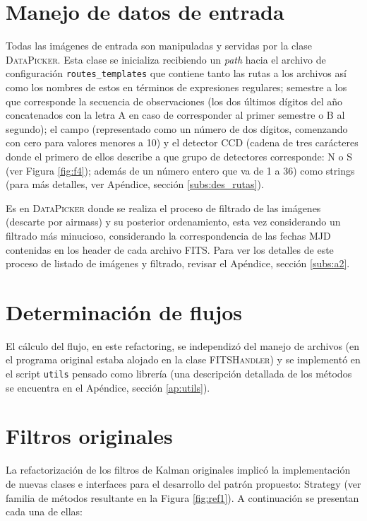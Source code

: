 \section{Manejo de datos de entrada}
Todas las im\'agenes de entrada son manipuladas y servidas por la clase \textsc{DataPicker}. Esta clase se inicializa recibiendo un \textit{path} hacia el archivo de configuraci\'on \texttt{routes\_templates} que contiene tanto las rutas a los archivos as\'i como los nombres de estos en t\'erminos de expresiones regulares; semestre a los que corresponde la secuencia de observaciones (los dos \'ultimos d\'igitos del a\~no concatenados con la letra A en caso de corresponder al primer semestre o B al segundo); el campo (representado como un n\'umero de dos d\'igitos, comenzando con cero para valores menores a 10) y el detector CCD (cadena de tres car\'acteres donde el primero de ellos describe a que grupo de detectores corresponde: N o S (ver Figura \ref{fig:f4}); adem\'as de un n\'umero entero que va de 1 a 36) como strings (para m\'as detalles, ver Ap\'endice, secci\'on \ref{subs:des_rutas}). 
\bigskip

Es en \textsc{DataPicker} donde se realiza el proceso de filtrado de las im\'agenes (descarte por \gls{airmass}) y su posterior ordenamiento, esta vez considerando un filtrado m\'as minucioso, considerando la correspondencia de las fechas MJD contenidas en los header de cada archivo FITS. Para ver los detalles de este proceso de listado de im\'agenes y filtrado, revisar el Ap\'endice, secci\'on \ref{subs:a2}.

\section{Determinaci\'on de flujos}
El c\'alculo del flujo, en este refactoring, se independiz\'o del manejo de archivos (en el programa original estaba alojado en la clase \textsc{FITSHandler}) y se implement\'o en el script \texttt{utils} pensado como librer\'ia (una descripci\'on detallada de los m\'etodos se encuentra en el Ap\'endice, secci\'on \ref{ap:utils}).
\bigskip

\section{Filtros originales}
La refactorizaci\'on de los filtros de Kalman originales implic\'o la implementaci\'on de nuevas clases e interfaces para el desarrollo del patr\'on propuesto: Strategy (ver familia de m\'etodos resultante en la Figura \ref{fig:ref1}). A continuaci\'on se presentan cada una de ellas:

